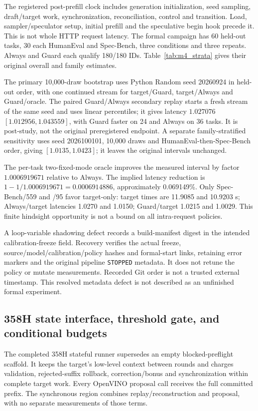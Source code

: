 The registered post-prefill clock includes generation initialization, seed sampling, draft/target work, synchronization, reconciliation, control and transition. Load, sampler/speculator setup, initial prefill and the speculative begin hook precede it. This is not whole HTTP request latency. The formal campaign has 60 held-out tasks, 30 each HumanEval and Spec-Bench, three conditions and three repeats. Always and Guard each qualify 180/180 IDs. Table~\ref{tab:m4_strata} gives their original overall and family estimates.



The primary 10,000-draw bootstrap uses Python Random seed 20260924 in held-out order, with one continued stream for target/Guard, target/Always and Guard/oracle. The paired Guard/Always secondary replay starts a fresh stream of the same seed and uses linear percentiles; it gives latency $1.027076$ $[1.012956,1.043559]$, with Guard faster on 24 and Always on 36 tasks. It is post-study, not the original preregistered endpoint. A separate family-stratified sensitivity uses seed 2026100101, 10,000 draws and HumanEval-then-Spec-Bench order, giving $[1.0135,1.0423]$; it leaves the original intervals unchanged.

The per-task two-fixed-mode oracle improves the measured interval by factor $1.0006919671$ relative to Always. The implied latency reduction is $1-1/1.0006919671=0.0006914886$, approximately 0.069149\%. Only Spec-Bench/559 and /95 favor target-only: target times are 11.9085 and 10.9203 s; Always/target latencies 1.0270 and 1.0150; Guard/target 1.0215 and 1.0029. This finite hindsight opportunity is not a bound on all intra-request policies.

A loop-variable shadowing defect records a build-manifest digest in the intended calibration-freeze field. Recovery verifies the actual freeze, source/model/calibration/policy hashes and formal-start links, retaining error markers and the original pipeline \texttt{STOPPED} metadata. It does not retune the policy or mutate measurements. Recorded Git order is not a trusted external timestamp. This resolved metadata defect is not described as an unfinished formal experiment.

\subsection{358H state interface, threshold gate, and conditional budgets}
\label{supp:358h_budgets}
The completed 358H stateful runner supersedes an empty blocked-preflight scaffold. It keeps the target's low-level context between rounds and charges validation, rejected-suffix rollback, correction/bonus and synchronization within complete target work. Every OpenVINO proposal call receives the full committed prefix. The synchronous region combines replay/reconstruction and proposal, with no separate measurements of those terms.

